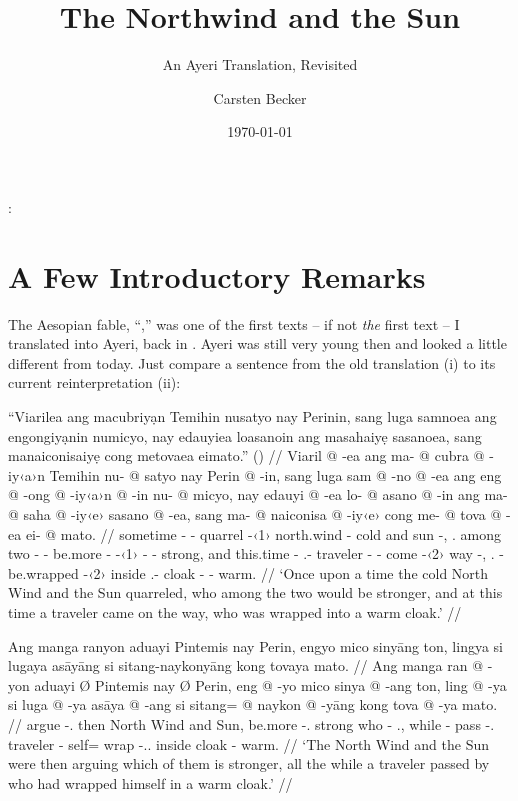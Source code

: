 \documentclass[12pt,paper=a4]{scrartcl}
\author{Carsten Becker}
\title{The Northwind and the Sun}
\subtitle{An Ayeri Translation, Revisited}
\date{\today} %
\newenvironment{mytitle}{
    \hfill
    \begin{minipage}{0.667\textwidth}
	\vspace{\baselineskip}
	\begin{center}
	    \Large
	    \sffamily\bfseries
	    \makeatletter
}{
	    \makeatother
	\end{center}
	\vspace{1em}
    \end{minipage}
    \hfill
}
\begin{document}

\begin{mytitle}
    \@title:\\
    \@subtitle
\end{mytitle}

\section{A Few Introductory Remarks}

The Aesopian fable, \enquote{,} was one of the first texts -- if not \emph{the} first text -- I translated into Ayeri, back in \citeyear{becker2004}. Ayeri was still very young then and looked a little different from today. Just compare a sentence from the old translation (i) to its current reinterpretation (ii):

\ex[exno=i, belowexskip=0em]
\begingl
	\glpreamble \enquote{Viarilea ang macubriyạn Temihin nusatyo nay Perinin, sang luga samnoea ang engongiyạnin numicyo, nay edauyiea loasanoin ang masahaiyẹ sasanoea, sang manaiconisaiyẹ cong metovaea eimato.} (\cite[1]{becker2004}) //
	\gla Viaril @ -ea ang ma- @ cubra @ -iy‹a›n Temihin nu- @ satyo nay Perin @ -in, sang luga sam @ -no @ -ea ang eng @ -ong @ -iy‹a›n @ -in nu- @ micyo, nay edauyi @ -ea lo- @ asano @ -in ang ma- @ saha @ -iy‹e› sasano @ -ea, sang ma- @ naiconisa @ -iy‹e› cong me- @ tova @ -ea ei- @ mato. //
	\glb sometime -\Loc{} \AgtT{} \Pst{}- quarrel -\Tpl{}‹1› north.wind \Aarg{}- cold and sun -\Top{}, \Rel{}.\Aarg{} among two -\Nmlz{} -\Loc{} \AgtT{} be.more -\Irr{} -\Tpl{}‹1› -\Top{} \Aarg{}- strong, and this.time -\Loc{} \Indf{}.\Aarg{}- traveler -\Top{} \AgtT{} \Pst{}- come -\Tsg{}‹2› way -\Loc{}, \Rel{}.\Aarg{} \Pst{}- be.wrapped -\Tsg{}‹2› inside \Indf{}.\Parg{}- cloak -\Loc{} \Obl{}- warm. //
	\glft `Once upon a time the cold North Wind and the Sun quarreled, who among the two would be stronger, and at this time a traveler came on the way, who was wrapped into a warm cloak.' //
\endgl\xe

\ex[exno=ii]
\begingl
	\glpreamble Ang manga ranyon aduayi Pintemis nay Perin, engyo mico sinyāng ton, lingya si lugaya asāyāng si sitang-naykonyāng kong tovaya mato. //
	\gla Ang manga ran @ -yon aduayi Ø Pintemis nay Ø Perin, eng @ -yo mico sinya @ -ang ton, ling @ -ya si luga @ -ya asāya @ -ang si sitang= @ naykon @ -yāng kong tova @ -ya mato. //
	\glb \AgtT{} \Prog{} argue -\Tpl{}.\N{} then \Top{} {North Wind} and \Top{} Sun, be.more -\Tsg{}.\N{} strong who -\Aarg{} \Tpl{}.\Gen{}, while -\Loc{} \Rel{} pass -\Tsg{}.\M{} traveler -\Aarg{} \Rel{} self= wrap -\Tsg{}.\M{}.\Aarg{} inside cloak -\Loc{} warm. //
	\glft `The North Wind and the Sun were then arguing which of them is stronger, all the while a traveler passed by who had wrapped himself in a warm cloak.' //
\endgl
\xe
\end{document}
